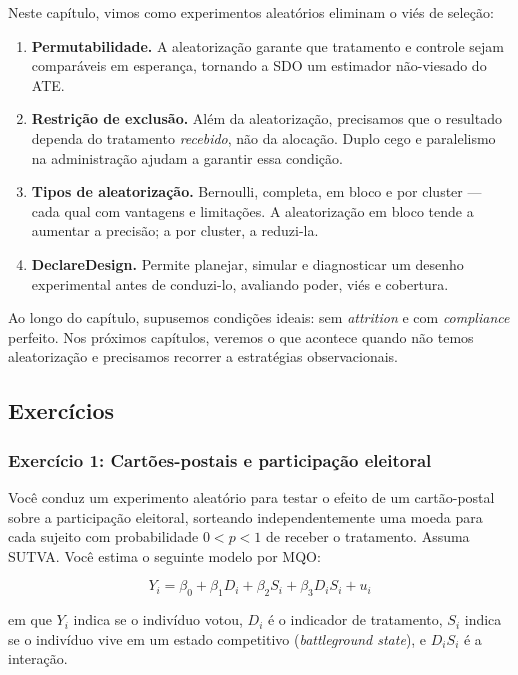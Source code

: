 \documentclass[
]{article}
\begin{document}
Neste capítulo, vimos como experimentos aleatórios eliminam o viés de seleção:

\begin{enumerate}
\def\labelenumi{\arabic{enumi}.}
\item
  \textbf{Permutabilidade.} A aleatorização garante que tratamento e controle sejam comparáveis em esperança, tornando a SDO um estimador não-viesado do ATE.
\item
  \textbf{Restrição de exclusão.} Além da aleatorização, precisamos que o resultado dependa do tratamento \emph{recebido}, não da alocação. Duplo cego e paralelismo na administração ajudam a garantir essa condição.
\item
  \textbf{Tipos de aleatorização.} Bernoulli, completa, em bloco e por cluster --- cada qual com vantagens e limitações. A aleatorização em bloco tende a aumentar a precisão; a por cluster, a reduzi-la.
\item
  \textbf{DeclareDesign.} Permite planejar, simular e diagnosticar um desenho experimental antes de conduzi-lo, avaliando poder, viés e cobertura.
\end{enumerate}

Ao longo do capítulo, supusemos condições ideais: sem \emph{attrition} e com \emph{compliance} perfeito. Nos próximos capítulos, veremos o que acontece quando não temos aleatorização e precisamos recorrer a estratégias observacionais.

\subsection{Exercícios}\label{exercuxedcios-1}

\subsubsection{Exercício 1: Cartões-postais e participação eleitoral}\label{exercuxedcio-1-cartuxf5es-postais-e-participauxe7uxe3o-eleitoral}

Você conduz um experimento aleatório para testar o efeito de um cartão-postal sobre a participação eleitoral, sorteando independentemente uma moeda para cada sujeito com probabilidade \(0 < p < 1\) de receber o tratamento. Assuma SUTVA. Você estima o seguinte modelo por MQO:

\[Y_i = \beta_0 + \beta_1 D_i + \beta_2 S_i + \beta_3 D_i S_i + u_i\]

em que \(Y_i\) indica se o indivíduo votou, \(D_i\) é o indicador de tratamento, \(S_i\) indica se o indivíduo vive em um estado competitivo (\emph{battleground state}), e \(D_i S_i\) é a interação.
\end{document}

